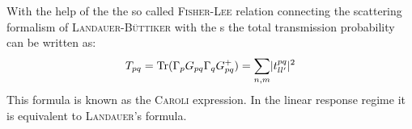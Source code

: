 With the help of the the so called \textsc{Fisher-Lee} relation \cite{PhysRevB.23.6851} connecting the scattering formalism of \textsc{Landauer-B\"uttiker} with the \gnfc s the total transmission probability can be written as:
\begin{align}
T_{pq} = \text{Tr}(\Gamma_p G_{pq} \Gamma_q G^+_{pq}) = \sum_{n,m} \lvert t^{pq}_{ll'}\rvert^2
\end{align}
This formula is known as the \textsc{Caroli} expression. In the linear response regime it is equivalent to \textsc{Landauer}'s formula\cite{PhysRevB.72.035450}.
